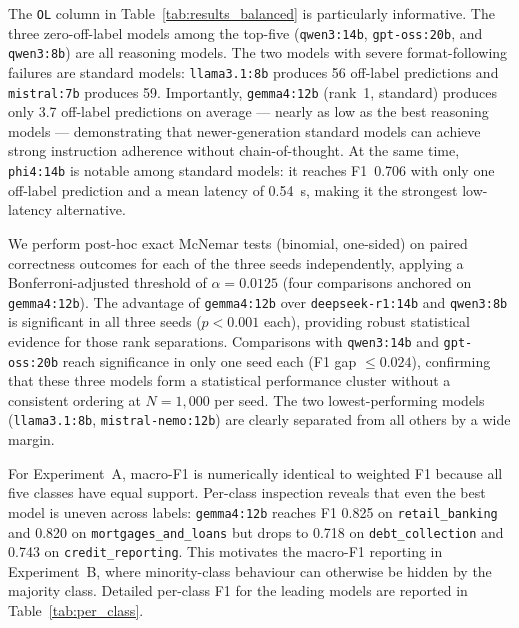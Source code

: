 \documentclass[journal]{IEEEtran}
\begin{document}
The \texttt{OL} column in Table~\ref{tab:results_balanced} is
particularly informative. The three zero-off-label models among
the top-five (\texttt{qwen3:14b}, \texttt{gpt-oss:20b}, and
\texttt{qwen3:8b}) are all reasoning models. The two models
with severe format-following failures are standard models:
\texttt{llama3.1:8b} produces 56 off-label predictions and
\texttt{mistral:7b} produces 59. Importantly, \texttt{gemma4:12b}
(rank~1, standard) produces only 3.7 off-label predictions on average
— nearly as low as the best reasoning models — demonstrating
that newer-generation standard models can achieve strong instruction
adherence without chain-of-thought. At the same time, \texttt{phi4:14b}
is notable among standard models: it reaches F1~0.706 with only one
off-label prediction and a mean latency of 0.54~s, making it the
strongest low-latency alternative.

We perform post-hoc exact McNemar tests (binomial, one-sided) on
paired correctness outcomes for each of the three seeds independently,
applying a Bonferroni-adjusted threshold of $\alpha{=}0.0125$ (four
comparisons anchored on \texttt{gemma4:12b}).
The advantage of \texttt{gemma4:12b} over \texttt{deepseek-r1:14b} and
\texttt{qwen3:8b} is significant in all three seeds ($p{<}0.001$ each),
providing robust statistical evidence for those rank separations.
Comparisons with \texttt{qwen3:14b} and \texttt{gpt-oss:20b} reach
significance in only one seed each (F1 gap $\leq 0.024$), confirming
that these three models form a statistical performance cluster without
a consistent ordering at $N{=}1{,}000$ per seed. The two lowest-performing
models (\texttt{llama3.1:8b}, \texttt{mistral-nemo:12b}) are clearly
separated from all others by a wide margin.

For Experiment~A, macro-F1 is numerically identical to weighted F1
because all five classes have equal support. Per-class inspection
reveals that even the best model is uneven across labels:
\texttt{gemma4:12b} reaches F1 0.825 on \texttt{retail\_banking} and
0.820 on \texttt{mortgages\_and\_loans} but drops to 0.718 on
\texttt{debt\_collection} and 0.743 on \texttt{credit\_reporting}.
This motivates the macro-F1 reporting in Experiment~B, where
minority-class behaviour can otherwise be hidden by the majority class.
Detailed per-class F1 for the leading models are reported in
Table~\ref{tab:per_class}.
\end{document}
